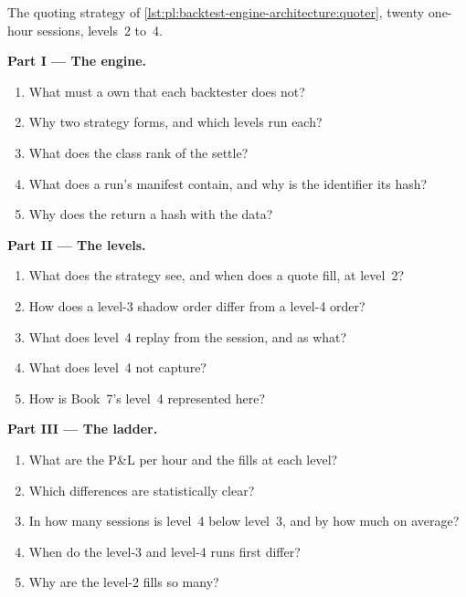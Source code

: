 \begin{problem}\label{pb:pl:backtest-engine-architecture:1}
The quoting strategy of \cref{lst:pl:backtest-engine-architecture:quoter}, twenty one-hour sessions, levels~2 to~4.

\medskip\noindent\textbf{Part I --- The engine.}
\begin{enumerate}
\item What must a  own that each backtester does not?
\item Why two strategy forms, and which levels run each?
\item What does the class rank of the  settle?
\item What does a run's manifest contain, and why is the identifier its hash?
\item Why does the  return a hash with the data?
\end{enumerate}

\medskip\noindent\textbf{Part II --- The levels.}
\begin{enumerate}[resume]
\item What does the strategy see, and when does a quote fill, at level~2?
\item How does a level-3 shadow order differ from a level-4 order?
\item What does level~4 replay from the session, and as what?
\item What does level~4 not capture?
\item How is Book~7's level~4 represented here?
\end{enumerate}

\medskip\noindent\textbf{Part III --- The ladder.}
\begin{enumerate}[resume]
\item What are the P\&L per hour and the fills at each level?
\item Which differences are statistically clear?
\item In how many sessions is level~4 below level~3, and by how much on average?
\item When do the level-3 and level-4 runs first differ?
\item Why are the level-2 fills so many?
\end{enumerate}


\end{problem}
